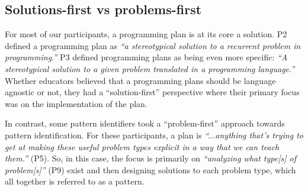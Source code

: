 \subsection{Solutions-first vs problems-first}

For most of our participants, a programming plan is at its core a solution. P2 defined a programming plan as \textit{``a stereotypical solution to a recurrent problem in programming.''} P3 defined programming plans as being even more specific: \textit{``A stereotypical solution to a given problem translated in a programming language.''} Whether educators believed that a programming plans should be language agnostic or not, they had a ``solution-first'' perspective where their primary focus was on the implementation of the plan.




In contrast, 
some pattern identifiers took a ``problem-first'' approach towards pattern identification. 
For these participants, a plan is \textit{``...anything that's trying to get at making these useful problem types explicit in a way that we can teach them.''} (P5). So, in this case, the focus is primarily on \textit{``analyzing what type[s] of problem[s]''} (P9) exist and then designing solutions to each problem type, which all together is referred to as a pattern.




